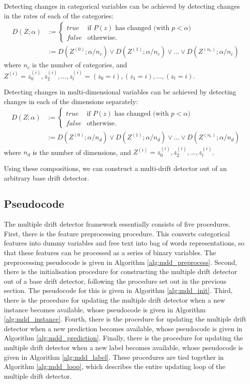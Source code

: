 Detecting changes in categorical variables can be achieved by detecting changes in the rates of each of the categories:
\begin{align}
  D(Z;\alpha) &:= \begin{cases}
  true & \text{if $P(z)$ has changed (with $p<\alpha$)} \\
  false & \text{otherwise}.
  \end{cases} \\
  &:= D(Z^{(0)};\alpha/n_c) \vee D(Z^{(1)};\alpha/n_c) \vee \dots \vee D(Z^{(n_c)};\alpha/n_c)
\end{align}
where $n_c$ is the number of categories, and $Z^{(i)}=z^{(i)}_0,z^{(i)}_2,\dots,z^{(i)}_t=(z_0=i),(z_1=i),\dots,(z_t=i)$.

Detecting changes in multi-dimensional variables can be achieved by detecting changes in each of the dimensions separately:
\begin{align}
  D(Z;\alpha) &:= \begin{cases}
  true & \text{if $P(z)$ has changed (with $p<\alpha$)} \\
  false & \text{otherwise}.
  \end{cases} \\
  &:= D(Z^{(0)};\alpha/n_d) \vee D(Z^{(1)};\alpha/n_d) \vee \dots \vee D(Z^{(n_c)};\alpha/n_d)
\end{align}
where $n_d$ is the number of dimensions, and $Z^{(i)}=z^{(i)}_0,z^{(i)}_2,\dots,z^{(i)}_t$.

Using these compositions, we can construct a multi-drift detector out of an arbitrary base drift detector.

\subsection{Pseudocode}

The multiple drift detector framework essentially consists of five procedures. First, there is the feature preprocessing procedure. This converts categorical features into dummy variables and free text into bag of words representations, so that these features can be processed as a series of binary variables. The preprocessing pseudocode is given in Algorithm \ref{alg:mdd_preprocess}. Second, there is the initialisation procedure for constructing the multiple drift detector out of a base drift detector, following the procedure set out in the previous section. The pseudocode for this is given in Algorithm \ref{alg:mdd_init}. Third, there is the procedure for updating the multiple drift detector when a new instance becomes available, whose pseudocode is given in Algorithm \ref{alg:mdd_instance}. Fourth, there is the procedure for updating the multiple drift detector when a new prediction becomes available, whose pseudocode is given in Algorithm \ref{alg:mdd_prediction}. Finally, there is the procedure for updating the multiple drift detector when a new label becomes available, whose pseudocode is given in Algorithm \ref{alg:mdd_label}. These procedures are tied together in Algorithm \ref{alg:mdd_loop}, which describes the entire updating loop of the multiple drift detector.

